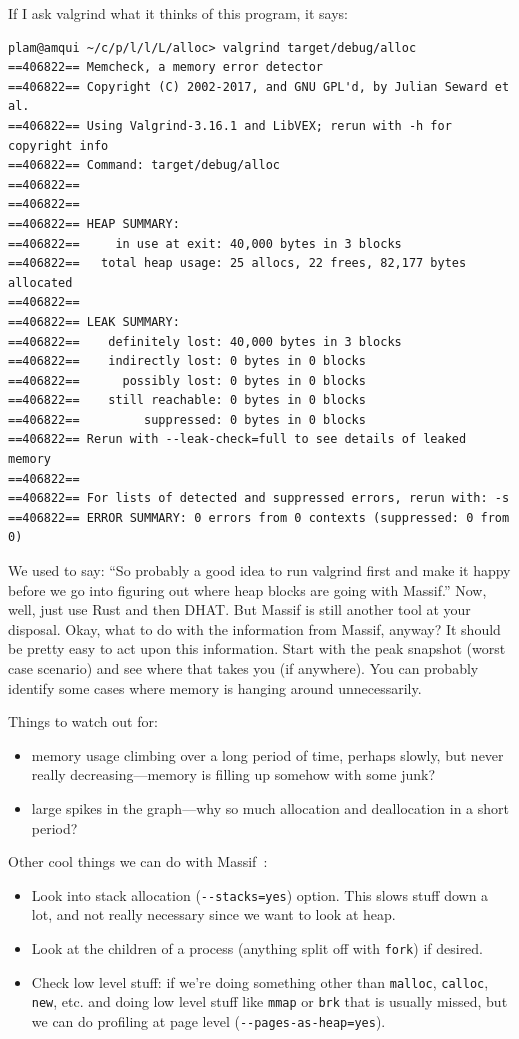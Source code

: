 If I ask valgrind what it thinks of this program, it says:

{\scriptsize
\begin{verbatim}
plam@amqui ~/c/p/l/l/L/alloc> valgrind target/debug/alloc
==406822== Memcheck, a memory error detector
==406822== Copyright (C) 2002-2017, and GNU GPL'd, by Julian Seward et al.
==406822== Using Valgrind-3.16.1 and LibVEX; rerun with -h for copyright info
==406822== Command: target/debug/alloc
==406822== 
==406822== 
==406822== HEAP SUMMARY:
==406822==     in use at exit: 40,000 bytes in 3 blocks
==406822==   total heap usage: 25 allocs, 22 frees, 82,177 bytes allocated
==406822== 
==406822== LEAK SUMMARY:
==406822==    definitely lost: 40,000 bytes in 3 blocks
==406822==    indirectly lost: 0 bytes in 0 blocks
==406822==      possibly lost: 0 bytes in 0 blocks
==406822==    still reachable: 0 bytes in 0 blocks
==406822==         suppressed: 0 bytes in 0 blocks
==406822== Rerun with --leak-check=full to see details of leaked memory
==406822== 
==406822== For lists of detected and suppressed errors, rerun with: -s
==406822== ERROR SUMMARY: 0 errors from 0 contexts (suppressed: 0 from 0)
\end{verbatim}
}

We used to say: ``So probably a good idea to run valgrind first and make it happy before we go into figuring out where heap blocks are going with Massif.'' Now, well, just use Rust and then DHAT. But Massif is still another tool at your disposal. Okay, what to do with the information from Massif, anyway? It should be pretty easy to act upon this information. Start with the peak snapshot (worst case scenario) and see where that takes you (if anywhere). You can probably identify some cases where memory is hanging around unnecessarily. 

Things to watch out for:
\begin{itemize}
\item memory usage climbing over a long period of time, perhaps slowly, but never really decreasing---memory is filling up somehow with some junk? 
\item large spikes in the graph---why so much allocation and deallocation in a short period?
\end{itemize}

Other cool things we can do with Massif~\cite{massif}:

\begin{itemize}
	\item Look into stack allocation (\verb+--stacks=yes+) option. This slows stuff down a lot, and not really necessary since we want to look at heap.
	\item Look at the children of a process (anything split off with \texttt{fork}) if desired.
	\item Check low level stuff: if we're doing something other than \texttt{malloc}, \texttt{calloc}, \texttt{new}, etc. and doing low level stuff like \texttt{mmap} or \texttt{brk} that is usually missed, but we can do profiling at page level (\verb+--pages-as-heap=yes+).
\end{itemize}


